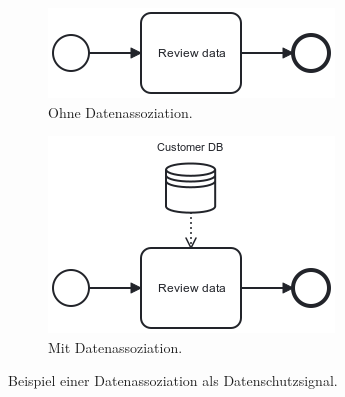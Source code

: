 \begin{figure}[h]
    \centering
    \begin{subfigure}{.5\textwidth}
        \centering
        \includegraphics[width=.7\linewidth]{images/process-models/data-association-example-uncritical-en}
        \caption{Ohne Datenassoziation.}
        \label{fig:without-data-association}
    \end{subfigure}%
    \begin{subfigure}{.5\textwidth}
        \centering
        \includegraphics[width=.7\linewidth]{images/process-models/data-association-example-critical-en}
        \caption{Mit Datenassoziation.}
        \label{fig:with-data-association}
    \end{subfigure}
    \caption{Beispiel einer Datenassoziation als Datenschutzsignal.}
    \label{fig:data-association-gdpr-example}
\end{figure}